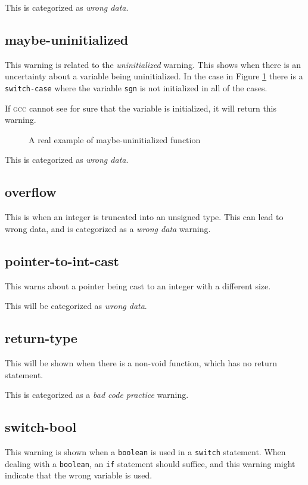 \documentclass[a4paper,11pt]{report}
\newcommand{\textcode}[1]{\fboxsep=1pt\texttt{\colorbox{gray!20}{#1}}}
\newcommand{\figa}{
    \begin{figure}[!htpb]
    \centering
}
\newcommand{\figb}[2]{
    \caption{#1}
    \label{#2}
    \end{figure}
}
\begin{document}
This is categorized as \emph{wrong data}.

            \fi %


            \subsection*{maybe-uninitialized}
This warning is related to the \emph{uninitialized} warning. This shows when 
there is an uncertainty about a variable being uninitialized. In the 
case in Figure \ref{lst:maybeuninitializedreal} there is a \texttt{switch-case} 
where the variable \textcode{sgn} is not initialized in all of the cases.

If \textsc{gcc} cannot see for sure that the variable is initialized, it will 
return this warning.

\figa
    \subfigure{
        
    }
\figb{A real example of maybe-uninitialized function}{lst:maybeuninitializedreal}

This is categorized as \emph{wrong data}.


            \subsection*{overflow}
This is when an integer is truncated into an unsigned type. This can lead to 
wrong data, and is categorized as a \emph{wrong data} warning.


            \subsection*{pointer-to-int-cast}
This warns about a pointer being cast to an integer with a different size.

This will be categorized as \emph{wrong data}.


            \subsection*{return-type}
This will be shown when there is a non-void function, which has no return 
statement.

This is categorized as a \emph{bad code practice} warning.


            \iffalse %

            \subsection*{switch-bool}
This warning is shown when a \texttt{boolean} is used in a \texttt{switch} 
statement. When dealing with a \texttt{boolean}, an \texttt{if} statement 
should suffice, and this warning might indicate that the wrong variable is used.
\end{document}

